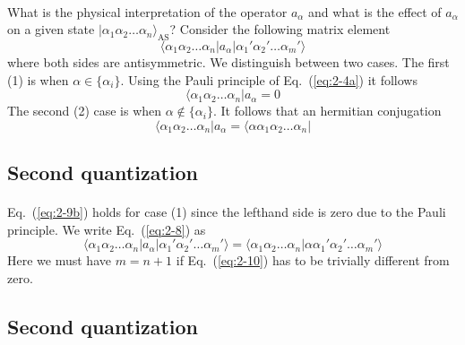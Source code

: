 \documentclass[%
twoside,                 %
final,                   %
10pt]{article}
\begin{document}
\paragraph{}
What is the physical interpretation of the operator $a_\alpha$ and what is the effect of 
$a_\alpha$ on a given state $|\alpha_1\alpha_2\dots\alpha_n\rangle_{\mathrm{AS}}$? 
Consider the following matrix element
\begin{equation}
	\langle\alpha_1\alpha_2 \dots \alpha_n|a_\alpha|\alpha_1'\alpha_2' \dots \alpha_m'\rangle \label{eq:2-8}
\end{equation}
where both sides are antisymmetric. We  distinguish between two cases. The first (1) is when
$\alpha \in \{\alpha_i\}$. Using the Pauli principle of Eq.~(\ref{eq:2-4a}) it follows
\begin{equation}
		\langle\alpha_1\alpha_2 \dots \alpha_n|a_\alpha = 0 \label{eq:2-9a}
\end{equation}
The second (2) case is when $\alpha \notin \{\alpha_i\}$. It follows that an hermitian conjugation
\begin{equation}
		\langle \alpha_1\alpha_2 \dots \alpha_n|a_\alpha = \langle\alpha\alpha_1\alpha_2 \dots \alpha_n|  \label{eq:2-9b}
\end{equation}




\subsection*{Second quantization}

\paragraph{}
Eq.~(\ref{eq:2-9b}) holds for case (1) since the lefthand side is zero due to the Pauli principle. We write
Eq.~(\ref{eq:2-8}) as
\begin{equation}
	\langle\alpha_1\alpha_2 \dots \alpha_n|a_\alpha|\alpha_1'\alpha_2' \dots \alpha_m'\rangle = 
	\langle \alpha_1\alpha_2 \dots \alpha_n|\alpha\alpha_1'\alpha_2' \dots \alpha_m'\rangle \label{eq:2-10}
\end{equation}
Here we must have $m = n+1$ if Eq.~(\ref{eq:2-10}) has to be trivially different from zero.




\subsection*{Second quantization}
\end{document}
